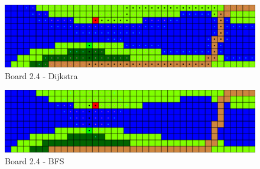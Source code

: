\begin{figure}[h!]
  \centering
    \includegraphics[width=\textwidth]{img/board-2-4-dijkstra}
    \caption{Board 2.4 - Dijkstra}
\end{figure}

\begin{figure}[h!]
  \centering
    \includegraphics[width=\textwidth]{img/board-2-4-bfs}
    \caption{Board 2.4 - BFS}
\end{figure}


